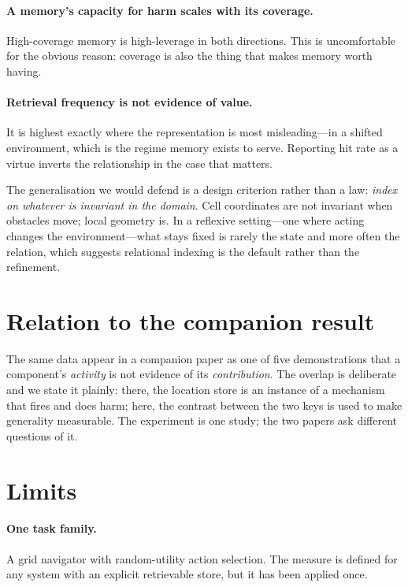\documentclass[11pt]{article}
\begin{document}
\paragraph{A memory's capacity for harm scales with its coverage.} High-coverage
memory is high-leverage in both directions. This is uncomfortable for the
obvious reason: coverage is also the thing that makes memory worth having.

\paragraph{Retrieval frequency is not evidence of value.} It is highest exactly
where the representation is most misleading---in a shifted environment, which is
the regime memory exists to serve. Reporting hit rate as a virtue inverts the
relationship in the case that matters.

The generalisation we would defend is a design criterion rather than a law:
\emph{index on whatever is invariant in the domain}. Cell coordinates are not
invariant when obstacles move; local geometry is. In a reflexive setting---one
where acting changes the environment---what stays fixed is rarely the state and
more often the relation, which suggests relational indexing is the default
rather than the refinement.

\section{Relation to the companion result}

The same data appear in a companion paper as one of five demonstrations that a
component's \emph{activity} is not evidence of its \emph{contribution}. The
overlap is deliberate and we state it plainly: there, the location store is an
instance of a mechanism that fires and does harm; here, the contrast between
the two keys is used to make generality measurable. The experiment is one
study; the two papers ask different questions of it.

\section{Limits}

\paragraph{One task family.} A grid navigator with random-utility action
selection. The measure is defined for any system with an explicit retrievable
store, but it has been applied once.
\end{document}

